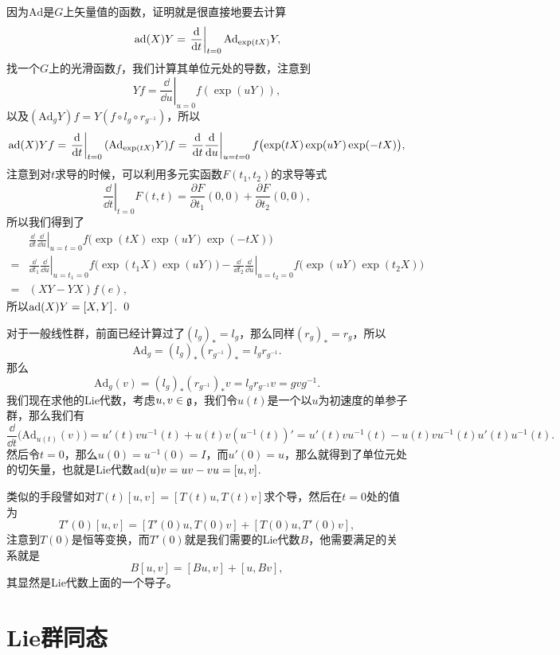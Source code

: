 \proof 
	因为$\mathrm{Ad}$是$G$上矢量值的函数，证明就是很直接地要去计算
	\[
		\operatorname{ad}(X)Y=\left.\frac{\mathrm{d}}{\mathrm{d} t}\right|_{t=0}\mathrm{Ad}_{\exp(tX)}Y,
	\]
	找一个$G$上的光滑函数$f$，我们计算其单位元处的导数，注意到
	\[
		Yf=\left.\frac{\dd}{\dd u}\right|_{u=0}f(\exp(uY)),
	\]
	以及$(\mathrm{Ad}_{g}Y)f=Y(f\circ l_g\circ r_{g^{-1}})$，所以
	\[
		\operatorname{ad}(X)Yf=\left.\frac{\mathrm{d}}{\mathrm{d} t}\right|_{t=0}(\mathrm{Ad}_{\exp(tX)}Y)f=\left.\frac{\mathrm{d}}{\mathrm{d} t}\frac{\mathrm{d}}{\mathrm{d} u}\right|_{u=t=0}f\bigl(\exp(tX)\exp(uY)\exp(-tX)\bigr),
	\]
	注意到对$t$求导的时候，可以利用多元实函数$F(t_1,t_2)$的求导等式
	\[
		\left.\frac{\dd}{\dd t}\right|_{t=0}F(t,t)=\frac{\partial F}{\partial t_1}(0,0)+\frac{\partial F}{\partial t_2}(0,0),
	\]
	所以我们得到了
	\[
	\begin{split}
		&\left.\frac{\dd}{\dd t}\frac{\dd}{\dd u}\right|_{u=t=0}f\bigl(\exp(tX)\exp(uY)\exp(-tX)\bigr)\\
		=&\left.\frac{\dd}{\dd t_1}\frac{\dd}{\dd u}\right|_{u=t_1=0}f\bigl(\exp(t_1X)\exp(uY)\bigr)-\left.\frac{\dd}{\dd t_2}\frac{\dd}{\dd u}\right|_{u=t_2=0}f\bigl(\exp(uY)\exp(t_2X)\bigr)\\
	=&(XY-YX)f(e),
	\end{split}
	\]
	所以$\operatorname{ad}(X)Y=[X,Y]$.
\qed


\para 对于一般线性群，前面已经计算过了$(l_g)_*=l_g$，那么同样$(r_g)_*=r_g$，所以
\[
	\mathrm{Ad}_g=(l_g)_*(r_{g^{-1}})_*=l_gr_{g^{-1}}.
\]
那么
\[
	\mathrm{Ad}_g(v)=(l_g)_*(r_{g^{-1}})_*v=l_gr_{g^{-1}}v=gvg^{-1}.
\]
我们现在求他的Lie代数，考虑$u,v\in {\mathfrak{g}}$，我们令$u(t)$是一个以$u$为初速度的单参子群，那么我们有
\[
	\frac{\dd}{\dd t}\bigl(\mathrm{Ad}_{u(t)}(v)\bigr)=u'(t)vu^{-1}(t)+u(t)v(u^{-1}(t))'=u'(t)vu^{-1}(t)-u(t)vu^{-1}(t)u'(t)u^{-1}(t).
\]
然后令$t=0$，那么$u(0)=u^{-1}(0)=I$，而$u'(0)=u$，那么就得到了单位元处的切矢量，也就是Lie代数$\operatorname{ad}(u)v=uv-vu=[u,v]$.

类似的手段譬如对$T(t)[u,v]=[T(t)u,T(t)v]$求个导，然后在$t=0$处的值为
\[
	T'(0)[u,v]=[T'(0)u,T(0)v]+[T(0)u,T'(0)v],
\]
注意到$T(0)$是恒等变换，而$T'(0)$就是我们需要的Lie代数$B$，他需要满足的关系就是
\[
	B[u,v]=[Bu,v]+[u,Bv],
\]
其显然是Lie代数上面的一个导子。

\section{Lie群同态}

